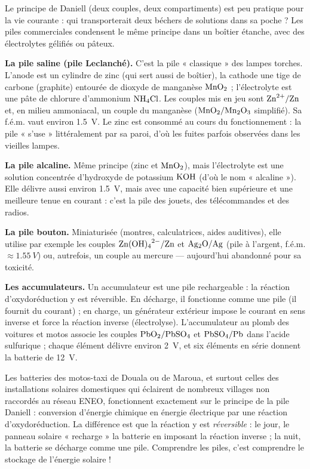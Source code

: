 \documentclass[11pt]{article}
\newcommand{\cle}[1]{{\popxbold\color{popdark}#1}}
\newcounter{popsec}
\newcounter{popsub}
\newcommand{\courssub}[1]{%
  \stepcounter{popsub}%
  \par\vspace{9pt}\noindent{\popxbold\fontsize{11.5}{13}\selectfont\color{popink}{\color{poporange}\thepopsec.\thepopsub}\hspace{6pt}#1}\par\nopagebreak\vspace{4pt}
}
\begin{document}
\courssub{Diversité des piles usuelles}

Le principe de Daniell (deux couples, deux compartiments) est peu pratique pour la vie courante : qui transporterait deux béchers de solutions dans sa poche ? Les piles commerciales condensent le même principe dans un boîtier étanche, avec des électrolytes gélifiés ou pâteux.

\textbf{La pile saline (pile Leclanché).} C'est la pile « classique » des lampes torches. L'anode est un cylindre de \cle{zinc} (qui sert aussi de boîtier), la cathode une tige de \cle{carbone} (graphite) entourée de dioxyde de manganèse $\ce{MnO2}$ ; l'électrolyte est une pâte de chlorure d'ammonium $\ce{NH4Cl}$. Les couples mis en jeu sont $\ce{Zn^2+}/\ce{Zn}$ et, en milieu ammoniacal, un couple du manganèse ($\ce{MnO2}/\ce{Mn2O3}$ simplifié). Sa f.é.m. vaut environ \SI{1,5}{V}. Le zinc est consommé au cours du fonctionnement : la pile « s'use » littéralement par sa paroi, d'où les fuites parfois observées dans les vieilles lampes.

\textbf{La pile alcaline.} Même principe (zinc et $\ce{MnO2}$), mais l'électrolyte est une solution concentrée d'hydroxyde de potassium $\ce{KOH}$ (d'où le nom « alcaline »). Elle délivre aussi environ \SI{1,5}{V}, mais avec une capacité bien supérieure et une meilleure tenue en courant : c'est la pile des jouets, des télécommandes et des radios.

\textbf{La pile bouton.} Miniaturisée (montres, calculatrices, aides auditives), elle utilise par exemple les couples $\ce{Zn(OH)4^2-}/\ce{Zn}$ et $\ce{Ag2O}/\ce{Ag}$ (pile à l'argent, f.é.m. $\approx \SI{1,55}{V}$) ou, autrefois, un couple au mercure — aujourd'hui abandonné pour sa toxicité.

\textbf{Les accumulateurs.} Un \cle{accumulateur} est une pile \cle{rechargeable} : la réaction d'oxydoréduction y est réversible. En décharge, il fonctionne comme une pile (il fournit du courant) ; en charge, un générateur extérieur impose le courant en sens inverse et force la réaction inverse (électrolyse). L'accumulateur au plomb des voitures et motos associe les couples $\ce{PbO2}/\ce{PbSO4}$ et $\ce{PbSO4}/\ce{Pb}$ dans l'acide sulfurique ; chaque élément délivre environ \SI{2}{V}, et six éléments en série donnent la batterie de \SI{12}{V}.

\begin{savaistu}
Les batteries des motos-taxi de Douala ou de Maroua, et surtout celles des installations solaires domestiques qui éclairent de nombreux villages non raccordés au réseau ENEO, fonctionnent exactement sur le principe de la pile Daniell : conversion d'énergie chimique en énergie électrique par une réaction d'oxydoréduction. La différence est que la réaction y est \emph{réversible} : le jour, le panneau solaire « recharge » la batterie en imposant la réaction inverse ; la nuit, la batterie se décharge comme une pile. Comprendre les piles, c'est comprendre le stockage de l'énergie solaire !
\end{savaistu}
\end{document}
